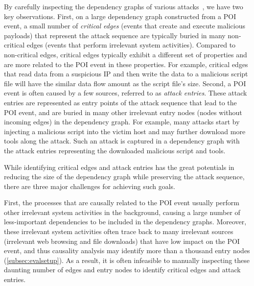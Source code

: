By carefully inspecting the dependency graphs of various attacks~\cite{gao2018aiql,mcitracking,liu2018priotracker,ma2016protracer}, we have two key observations.
%
First, on a large dependency graph constructed from a POI event, a small number of \emph{critical edges} (\eg events that create and execute malicious payloads) that represent the attack sequence are typically buried in many non-critical edges (\eg events that perform irrelevant system activities).
Compared to non-critical edges, critical edges typically exhibit a different set of properties and are more related to the POI event in these properties. 
For example, critical edges that read data from a suspicious IP and then write the data to a malicious script file will have the similar data flow amount as the script file's size. 
Second, a POI event is often caused by a few sources, referred to as \emph{attack entries}.
These attack entries are represented as entry points of the attack sequence that lead to the POI event, and are buried in many other irrelevant entry nodes (\ie nodes without incoming edges) in the dependency graph.
For example, many attacks start by injecting a malicious script into the victim host and may further download more tools along the attack.
Such an attack is captured in a dependency graph with the attack entries representing the downloaded malicious script and tools. 
%

While identifying critical edges and attack entries has the great potentials in reducing the size of the dependency graph while preserving the attack sequence, there are three major challenges for achieving such goals.

First, the processes that are causally related to the POI event usually perform other irrelevant system activities in the background, causing a large number of less-important dependencies to be included in the dependency graphs.
Moreover, these irrelevant system activities often trace back to many irrelevant sources (\eg irrelevant web browsing and file downloads) that have low impact on the POI event, and thus causality analysis may identify more than a thousand entry nodes (\cref{subsec:evalsetup}).
As a result, it is often infeasible to manually inspecting these daunting number of edges and entry nodes to identify critical edges and attack entries.

